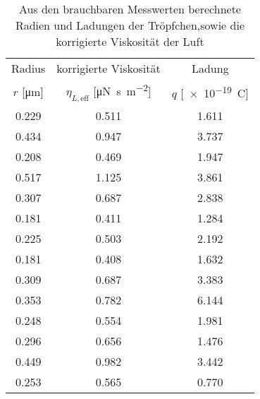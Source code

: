 \begin{table}[!h]
	\centering
	\begin{tabular}{|c|c|c|}
		\hline
		Radius & korrigierte Viskosität & Ladung\\
		$r$ [\si{\micro\meter}] & $\eta_{L,\text{eff}}$ [\si{\micro\newton\second\per\square\meter}] & $q$ [\SI{e-19}{\coulomb}]\\
\hline\hline
		\num{0.229} & \num{0.511} & \num{1.611}\\
		\num{0.434} & \num{0.947} & \num{3.737}\\
		\num{0.208} & \num{0.469} & \num{1.947}\\
		\num{0.517} & \num{1.125} & \num{3.861}\\
		\num{0.307} & \num{0.687} & \num{2.838}\\
		\num{0.181} & \num{0.411} & \num{1.284}\\
		\num{0.225} & \num{0.503} & \num{2.192}\\
		\num{0.181} & \num{0.408} & \num{1.632}\\
		\num{0.309} & \num{0.687} & \num{3.383}\\
		\num{0.353} & \num{0.782} & \num{6.144}\\
		\num{0.248} & \num{0.554} & \num{1.981}\\
		\num{0.296} & \num{0.656} & \num{1.476}\\
		\num{0.449} & \num{0.982} & \num{3.442}\\
		\num{0.253} & \num{0.565} & \num{0.770}\\
		\hline
	\end{tabular}
	\caption{Aus den brauchbaren Messwerten berechnete Radien und Ladungen der Tröpfchen,sowie die korrigierte Viskosität der Luft \label{tab:Auswertung_Ergebnisse2}}
\end{table}

